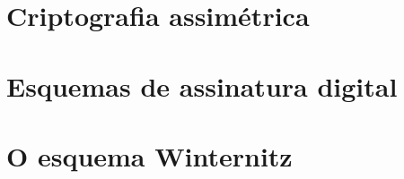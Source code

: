 \documentclass{article}
\begin{document}
\begin{itemize}




\end{itemize}


\section*{Criptografia assimétrica}

\section*{Esquemas de assinatura digital}

\section*{O esquema Winternitz}


 
\end{document}
